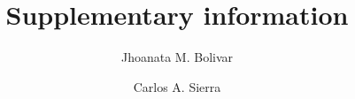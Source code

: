\documentclass[review, authoryear]{elsarticle}   	%
\begin{document}
\begin{frontmatter}

\title{Supplementary information}
\author[MPI,CYB]{Jhoanata M. Bolivar}
\author[MPI,CYB]{Carlos A. Sierra}
\address[MPI]{Max Planck Institute for Biogeochemistry, Hans-Kn\"oll-Str. 10, 07745 Jena, Germany}
\address[CYB]{Research Center on Ecosystems and Global Change Carbono \& Bosques, Medell\'in, Colombia}


\end{frontmatter}

\end{document}
